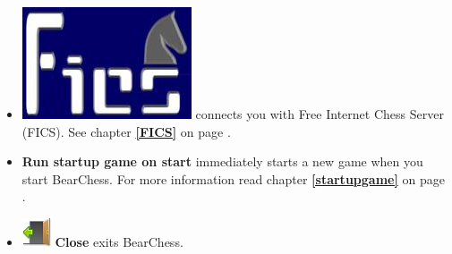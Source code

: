 \documentclass[11pt,a4paper]{article}
\begin{document}
\begin{itemize}
	\item \includegraphics[scale=0.1]{FicsLogo.png} connects you with Free Internet Chess Server (FICS). See chapter \textbf{\ref{FICS}  } on page \pageref{FICS}.	
	
	\item \textbf{Run startup game on start} immediately starts a new game when you start BearChess. For more information read chapter \textbf{\ref{startupgame}  } on page \pageref{startupgame}.
	
	\item \includegraphics[scale=0.5]{door_out.png} \textbf{Close} exits BearChess.
\end{itemize}
\end{document}
